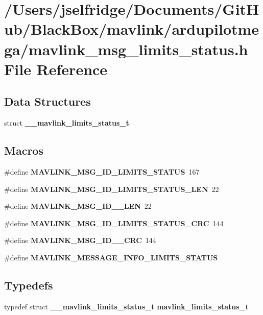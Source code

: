 \section{/\+Users/jselfridge/\+Documents/\+Git\+Hub/\+Black\+Box/mavlink/ardupilotmega/mavlink\+\_\+msg\+\_\+limits\+\_\+status.h File Reference}
\label{mavlink__msg__limits__status_8h}
\subsection*{Data Structures}
\begin{DoxyCompactItemize}
\item 
struct \textbf{ \+\_\+\+\_\+mavlink\+\_\+limits\+\_\+status\+\_\+t}
\end{DoxyCompactItemize}
\subsection*{Macros}
\begin{DoxyCompactItemize}
\item 
\#define \textbf{ M\+A\+V\+L\+I\+N\+K\+\_\+\+M\+S\+G\+\_\+\+I\+D\+\_\+\+L\+I\+M\+I\+T\+S\+\_\+\+S\+T\+A\+T\+US}~167
\item 
\#define \textbf{ M\+A\+V\+L\+I\+N\+K\+\_\+\+M\+S\+G\+\_\+\+I\+D\+\_\+\+L\+I\+M\+I\+T\+S\+\_\+\+S\+T\+A\+T\+U\+S\+\_\+\+L\+EN}~22
\item 
\#define \textbf{ M\+A\+V\+L\+I\+N\+K\+\_\+\+M\+S\+G\+\_\+\+I\+D\+\_\+\_\+\+L\+EN}~22
\item 
\#define \textbf{ M\+A\+V\+L\+I\+N\+K\+\_\+\+M\+S\+G\+\_\+\+I\+D\+\_\+\+L\+I\+M\+I\+T\+S\+\_\+\+S\+T\+A\+T\+U\+S\+\_\+\+C\+RC}~144
\item 
\#define \textbf{ M\+A\+V\+L\+I\+N\+K\+\_\+\+M\+S\+G\+\_\+\+I\+D\+\_\+\_\+\+C\+RC}~144
\item 
\#define \textbf{ M\+A\+V\+L\+I\+N\+K\+\_\+\+M\+E\+S\+S\+A\+G\+E\+\_\+\+I\+N\+F\+O\+\_\+\+L\+I\+M\+I\+T\+S\+\_\+\+S\+T\+A\+T\+US}
\end{DoxyCompactItemize}
\subsection*{Typedefs}
\begin{DoxyCompactItemize}
\item 
typedef struct \textbf{ \+\_\+\+\_\+mavlink\+\_\+limits\+\_\+status\+\_\+t} \textbf{ mavlink\+\_\+limits\+\_\+status\+\_\+t}
\end{DoxyCompactItemize}


